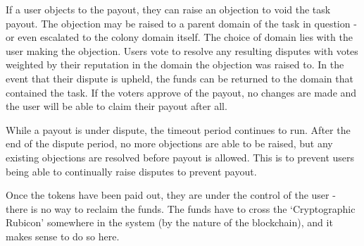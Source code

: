If a user objects to the payout, they can raise an objection to void the task payout. The objection may be raised to a parent domain of the task in question - or even escalated to the colony domain itself. The choice of domain lies with the user making the objection. Users vote to resolve any resulting disputes with votes weighted by their reputation in the domain the objection was raised to. In the event that their dispute is upheld, the funds can be returned to the domain that contained the task. If the voters approve of the payout, no changes are made and the user will be able to claim their payout after all.

While a payout is under dispute, the timeout period continues to run. After the end of the dispute period, no more objections are able to be raised, but any existing objections are resolved before payout is allowed.  This is to prevent users being able to continually raise disputes to prevent payout.

Once the tokens have been paid out, they are under the control of the user - there is no way to reclaim the funds. The funds have to cross the `Cryptographic Rubicon' somewhere in the system (by the nature of the blockchain), and it makes sense to do so here. 